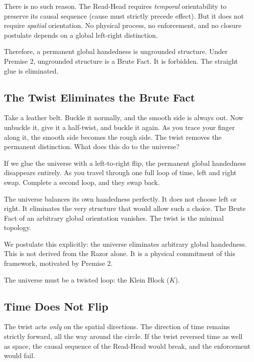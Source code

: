 \documentclass[11pt]{article}
\theoremstyle{canonstyle}
\providecommand{\Klein}{\mathcal{K}}
\def\mathcal#1{#1}%
\begin{document}
There is no such reason. The Read-Head requires \emph{temporal} orientability to preserve its causal sequence (cause must strictly precede effect). But it does not require \emph{spatial} orientation. No physical process, no enforcement, and no closure postulate depends on a global left-right distinction. 

Therefore, a permanent global handedness is ungrounded structure. Under Premise 2, ungrounded structure is a Brute Fact. It is forbidden. The straight glue is eliminated.

\subsection{The Twist Eliminates the Brute Fact}

\begin{reflect}
Take a leather belt. Buckle it normally, and the smooth side is always out. Now unbuckle it, give it a half-twist, and buckle it again. As you trace your finger along it, the smooth side becomes the rough side. The twist removes the permanent distinction. What does this do to the universe?
\end{reflect}

If we glue the universe with a left-to-right flip, the permanent global handedness disappears entirely. As you travel through one full loop of time, left and right swap. Complete a second loop, and they swap back. 

The universe balances its own handedness perfectly. It does not choose left or right. It eliminates the very structure that would allow such a choice. The Brute Fact of an arbitrary global orientation vanishes. The twist is the minimal topology.

We postulate this explicitly: the universe eliminates arbitrary global handedness. This is not derived from the Razor alone. It is a physical commitment of this framework, motivated by Premise 2.

\begin{keyresult}
The universe must be a twisted loop: the Klein Block ($\Klein$).
\end{keyresult}

\subsection{Time Does Not Flip}

The twist acts \emph{only} on the spatial directions. The direction of time remains strictly forward, all the way around the circle. If the twist reversed time as well as space, the causal sequence of the Read-Head would break, and the enforcement would fail. 
\end{document}
